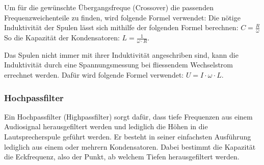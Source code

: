 \documentclass[a4paper,11pt]{report}
\begin{document}
Um für die gewünschte Übergangsfreque (Crossover) die passenden Frequenzweichenteile zu finden, wird folgende Formel verwendet:
Die nötige Induktivität der Spulen lässt sich mithilfe der folgenden Formel berechnen: $C = \frac{R}{\omega}$ 
So die Kapazität der Kondensatoren: $L = \frac{1}{\omega \cdot R}$.

Das Spulen nicht immer mit ihrer Induktivität angeschriben sind, kann die Induktivität durch eine Spannungsmessung bei fliessendem Wechselstrom errechnet werden. Dafür wird folgende Formel verwendet: $U = I \cdot \omega \cdot L$.

\subsubsection*{Hochpassfilter}
Ein Hochpassfilter (Highpassfilter) sorgt dafür, dass tiefe Frequenzen aus einem Audiosignal herausgefiltert werden und lediglich die Höhen in die Lautsprecherspule geführt werden. Er besteht in seiner einfachsten Ausführung lediglich aus einem oder mehrern Kondensatoren. Dabei bestimmt die Kapazität die Eckfrequenz, also der Punkt, ab welchem Tiefen herausgefiltert werden.
\end{document}
